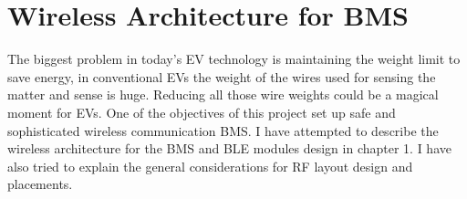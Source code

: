 \section*{Wireless Architecture for BMS}
The biggest problem in today's EV technology is maintaining the weight limit to save energy, in conventional EVs the weight of the wires used for sensing the matter and sense is huge.  Reducing all those wire weights could be a magical moment for EVs. One of the objectives of this project set up safe and sophisticated wireless communication BMS. I have attempted to describe the wireless architecture for the BMS and BLE modules design in chapter 1. I have also tried to explain the general considerations for RF layout design and placements. 
